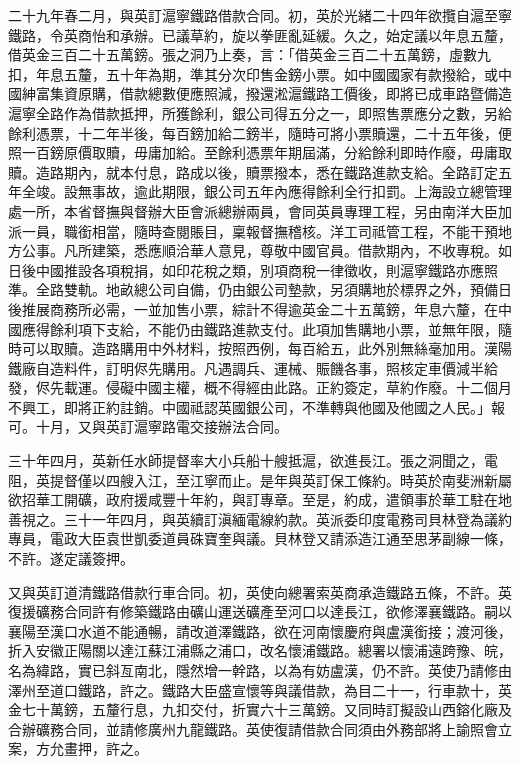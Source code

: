 \begin{pinyinscope}
二十九年春二月，與英訂滬寧鐵路借款合同。初，英於光緒二十四年欲攬自滬至寧鐵路，令英商怡和承辦。已議草約，旋以拳匪亂延緩。久之，始定議以年息五釐，借英金三百二十五萬鎊。張之洞乃上奏，言：「借英金三百二十五萬鎊，虛數九扣，年息五釐，五十年為期，準其分次印售金鎊小票。如中國國家有款撥給，或中國紳富集資原購，借款總數便應照減，撥還淞滬鐵路工價後，即將已成車路暨備造滬寧全路作為借款抵押，所獲餘利，銀公司得五分之一，即照售票應分之數，另給餘利憑票，十二年半後，每百鎊加給二鎊半，隨時可將小票贖還，二十五年後，便照一百鎊原價取贖，毋庸加給。至餘利憑票年期屆滿，分給餘利即時作廢，毋庸取贖。造路期內，就本付息，路成以後，贖票撥本，悉在鐵路進款支給。全路訂定五年全竣。設無事故，逾此期限，銀公司五年內應得餘利全行扣罰。上海設立總管理處一所，本省督撫與督辦大臣會派總辦兩員，會同英員專理工程，另由南洋大臣加派一員，職銜相當，隨時查閱賬目，稟報督撫稽核。洋工司祗管工程，不能干預地方公事。凡所建築，悉應順洽華人意見，尊敬中國官員。借款期內，不收專稅。如日後中國推設各項稅捐，如印花稅之類，別項商稅一律徵收，則滬寧鐵路亦應照準。全路雙軌。地畝總公司自備，仍由銀公司墊款，另須購地於標界之外，預備日後推展商務所必需，一並加售小票，綜計不得逾英金二十五萬鎊，年息六釐，在中國應得餘利項下支給，不能仍由鐵路進款支付。此項加售購地小票，並無年限，隨時可以取贖。造路購用中外材料，按照西例，每百給五，此外別無絲毫加用。漢陽鐵廠自造料件，訂明侭先購用。凡遇調兵、運械、賑饑各事，照核定車價減半給發，侭先載運。侵礙中國主權，概不得經由此路。正約簽定，草約作廢。十二個月不興工，即將正約註銷。中國祗認英國銀公司，不準轉與他國及他國之人民。」報可。十月，又與英訂滬寧路電交接辦法合同。

三十年四月，英新任水師提督率大小兵船十艘抵滬，欲進長江。張之洞聞之，電阻，英提督僅以四艘入江，至江寧而止。是年與英訂保工條約。時英於南斐洲新屬欲招華工開礦，政府援咸豐十年約，與訂專章。至是，約成，遣領事於華工駐在地善視之。三十一年四月，與英續訂滇緬電線約款。英派委印度電務司貝林登為議約專員，電政大臣袁世凱委道員硃寶奎與議。貝林登又請添造江通至思茅副線一條，不許。遂定議簽押。

又與英訂道清鐵路借款行車合同。初，英使向總署索英商承造鐵路五條，不許。英復援礦務合同許有修築鐵路由礦山運送礦產至河口以達長江，欲修澤襄鐵路。嗣以襄陽至漢口水道不能通暢，請改道澤鐵路，欲在河南懷慶府與盧漢銜接；渡河後，折入安徽正陽關以達江蘇江浦縣之浦口，改名懷浦鐵路。總署以懷浦遠跨豫、皖，名為緯路，實已斜亙南北，隱然增一幹路，以為有妨盧漢，仍不許。英使乃請修由澤州至道口鐵路，許之。鐵路大臣盛宣懷等與議借款，為目二十一，行車款十，英金七十萬鎊，五釐行息，九扣交付，折實六十三萬鎊。又同時訂擬設山西鎔化廠及合辦礦務合同，並請修廣州九龍鐵路。英使復請借款合同須由外務部將上諭照會立案，方允畫押，許之。


\end{pinyinscope}
